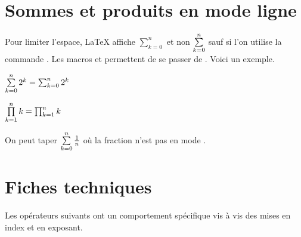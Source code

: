 \documentclass[12pt,a4paper]{article}
\begin{document}
\section{Sommes et produits en mode ligne}

Pour limiter l'espace, \LaTeX{} affiche $\sum_{k=0}^{n}$ et non $\sum\limits_{k=0}^{n}$ sauf si l'on utilise la commande .
Les macros  et  permettent de se passer de .
Voici un exemple.


\begin{latexex}
 $\sum\limits_{k=0}^{n} 2^k
= \sum_{k=0}^{n} 2^k$

 $\prod\limits_{k=1}^{n} k
= \prod_{k=1}^{n} k$
\end{latexex}


\begin{remark}
	On peut taper  $\sum\limits_{k=0}^{n} \frac{1}{n}$ où la fraction n'est pas en mode .
\end{remark}




\section{Fiches techniques}

Les opérateurs suivants ont un comportement spécifique vis à vis des mises en index et en exposant. 


\separation



\end{document}
